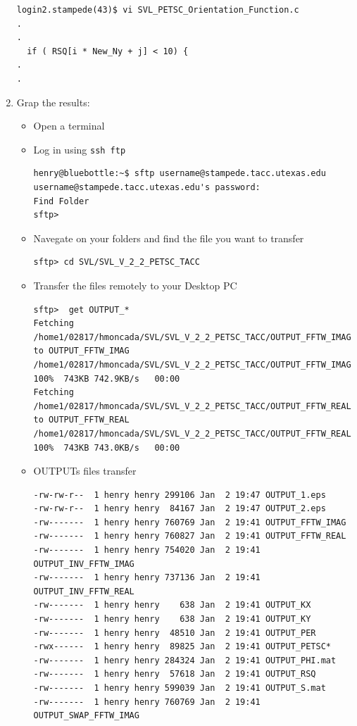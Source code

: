 \documentclass{article}
\begin{document}
\begin{enumerate}
\begin{verbatim}
login2.stampede(43)$ vi SVL_PETSC_Orientation_Function.c 
.
.
  if ( RSQ[i * New_Ny + j] < 10) {
.
.
\end{verbatim}
\normalsize
\item Grap the results:
\begin{itemize}
\item Open a terminal
\item Log in using \verb+ssh ftp+
\scriptsize
\begin{verbatim}
henry@bluebottle:~$ sftp username@stampede.tacc.utexas.edu
username@stampede.tacc.utexas.edu's password:
Find Folder 
sftp>  
\end{verbatim}
\normalsize
\item Navegate on your folders and find the file you want to transfer
\scriptsize
\begin{verbatim}
sftp> cd SVL/SVL_V_2_2_PETSC_TACC 
\end{verbatim}
\normalsize
\item Transfer the files remotely to your Desktop PC
\scriptsize
\begin{verbatim}
sftp>  get OUTPUT_*
Fetching /home1/02817/hmoncada/SVL/SVL_V_2_2_PETSC_TACC/OUTPUT_FFTW_IMAG to OUTPUT_FFTW_IMAG
/home1/02817/hmoncada/SVL/SVL_V_2_2_PETSC_TACC/OUTPUT_FFTW_IMAG    100%  743KB 742.9KB/s   00:00    
Fetching /home1/02817/hmoncada/SVL/SVL_V_2_2_PETSC_TACC/OUTPUT_FFTW_REAL to OUTPUT_FFTW_REAL
/home1/02817/hmoncada/SVL/SVL_V_2_2_PETSC_TACC/OUTPUT_FFTW_REAL                                          100%  743KB 743.0KB/s   00:00    
\end{verbatim}
\normalsize
\item  OUTPUTs files transfer
\scriptsize
\begin{verbatim}
-rw-rw-r--  1 henry henry 299106 Jan  2 19:47 OUTPUT_1.eps
-rw-rw-r--  1 henry henry  84167 Jan  2 19:47 OUTPUT_2.eps
-rw-------  1 henry henry 760769 Jan  2 19:41 OUTPUT_FFTW_IMAG
-rw-------  1 henry henry 760827 Jan  2 19:41 OUTPUT_FFTW_REAL
-rw-------  1 henry henry 754020 Jan  2 19:41 OUTPUT_INV_FFTW_IMAG
-rw-------  1 henry henry 737136 Jan  2 19:41 OUTPUT_INV_FFTW_REAL
-rw-------  1 henry henry    638 Jan  2 19:41 OUTPUT_KX
-rw-------  1 henry henry    638 Jan  2 19:41 OUTPUT_KY
-rw-------  1 henry henry  48510 Jan  2 19:41 OUTPUT_PER
-rwx------  1 henry henry  89825 Jan  2 19:41 OUTPUT_PETSC*
-rw-------  1 henry henry 284324 Jan  2 19:41 OUTPUT_PHI.mat
-rw-------  1 henry henry  57618 Jan  2 19:41 OUTPUT_RSQ
-rw-------  1 henry henry 599039 Jan  2 19:41 OUTPUT_S.mat
-rw-------  1 henry henry 760769 Jan  2 19:41 OUTPUT_SWAP_FFTW_IMAG

\end{verbatim}
\end{itemize}
\end{enumerate}
\end{document}
